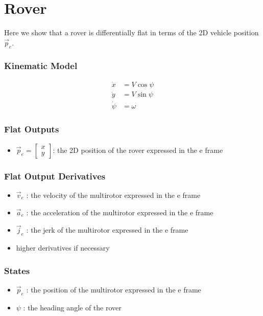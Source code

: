 \documentclass[10pt]{book}
\begin{document}
\section{Rover}

Here we show that a rover is differentially flat in terms of the 2D vehicle position $\vec{p}_e$.

\subsubsection*{Kinematic Model}
\begin{align*}
    \dot{x} &= V \cos{\psi}  \\
    \dot{y} &= V \sin{\psi} \\
    \dot{\psi} &= \omega
\end{align*}

\subsubsection*{Flat Outputs}
\begin{itemize}
    \item $\vec{p}_e = \begin{bmatrix}x \\ y\end{bmatrix}$: the 2D position of the rover expressed in the e frame
\end{itemize}

\subsubsection*{Flat Output Derivatives}
\begin{itemize}
    \item $\vec{v}_e$ : the velocity of the multirotor expressed in the e frame
    \item $\vec{a}_e$ : the acceleration of the multirotor expressed in the e frame
    \item $\vec{j}_e$ : the jerk of the multirotor expressed in the e frame
    \item higher derivatives if necessary
\end{itemize}

\subsubsection*{States}
\begin{itemize}
    \item $\vec{p}_e$ : the position of the multirotor expressed in the e frame
    \item $\psi$ : the heading angle of the rover
\end{itemize}
\end{document}
